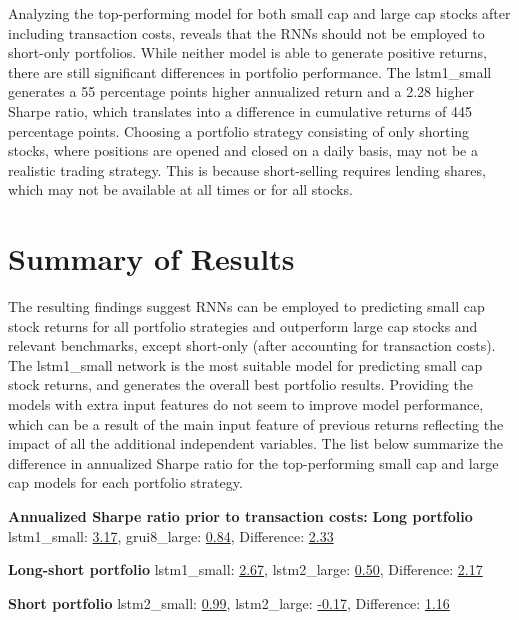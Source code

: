 \indent\newline 
Analyzing the top-performing model for both small cap and large cap stocks after including transaction costs, reveals that the RNNs should not be employed to short-only portfolios. While neither model is able to generate positive returns, there are still significant differences in portfolio performance. The lstm1\_small generates a 55 percentage points higher annualized return and a 2.28 higher Sharpe ratio, which translates into a difference in cumulative returns of 445 percentage points. Choosing a portfolio strategy consisting of only shorting stocks, where positions are opened and closed on a daily basis, may not be a realistic trading strategy. This is because short-selling requires lending shares, which may not be available at all times or for all stocks. 

\section{Summary of Results}
The resulting findings suggest RNNs can be employed to predicting small cap stock returns for all portfolio strategies and outperform large cap stocks and relevant benchmarks, except short-only (after accounting for transaction costs). The lstm1\_small network is the most suitable model for predicting small cap stock returns, and generates the overall best portfolio results. Providing the models with extra input features do not seem to improve model performance, which can be a result of the main input feature of previous returns reflecting the impact of all the additional independent variables. The list below summarize the difference in annualized Sharpe ratio for the top-performing small cap and large cap models for each portfolio strategy.

\indent\newline
\textbf{Annualized Sharpe ratio prior to transaction costs:}
\indent\newline
\textbf{Long portfolio} 
\indent\newline
lstm1\_small: \underline{3.17},  grui8\_large: \underline{0.84},  Difference: \underline{2.33}

\indent\newline
\textbf{Long-short portfolio} 
\indent\newline
lstm1\_small: \underline{2.67},  lstm2\_large: \underline{0.50},  Difference:  \underline{2.17}  

\indent\newline
\textbf{Short portfolio} 
\indent\newline
lstm2\_small: \underline{0.99},  lstm2\_large: \underline{-0.17},  Difference: \underline{1.16} 

